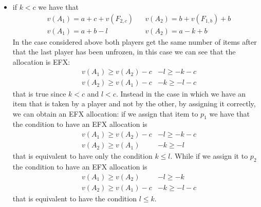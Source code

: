 \documentclass{article}
\begin{document}
\begin{itemize}
    \item if $k < c$ we have that
    \begin{align*}
        &v(A_1) = a + c + v(F_{2,c}) && v(A_2) = b + v(F_{1,b}) + b\\
        &v(A_1) = a + b-l && v(A_2) = a - k + b
    \end{align*}
    In the case considered above both players get the same number of items after that the last player has been unfrozen, in this case we can see that the allocation is EFX: 
    \begin{align*}
        &v(A_1) \ge v(A_2) -c & -l \ge - k - c\\
        &v(A_2) \ge v(A_1) -c & -k \ge -l -c
    \end{align*}
    that is true since $k<c$ and $l<c$.
    Instead in the case in which we have an item that is taken by a player and not by the other, by assigning it correctly, we can obtain an EFX allocation: if we assign that item to $p_1$ we have that the condition to have an EFX allocation is
    \begin{align*}
        &v(A_1) \ge v(A_2) -c & -l \ge - k - c\\
        &v(A_2) \ge v(A_1) & -k \ge -l 
    \end{align*}
    that is equivalent to have only the condition $k\le l$.
    While if we assign it to $p_2$ the condition to have an EFX allocation is
    \begin{align*}
        &v(A_1) \ge v(A_2) & -l \ge - k\\
        &v(A_2) \ge v(A_1)-c & -k \ge -l -c
    \end{align*}
    that is equivalent to have the condition $l\le k$.
    

\end{itemize}
\end{document}
